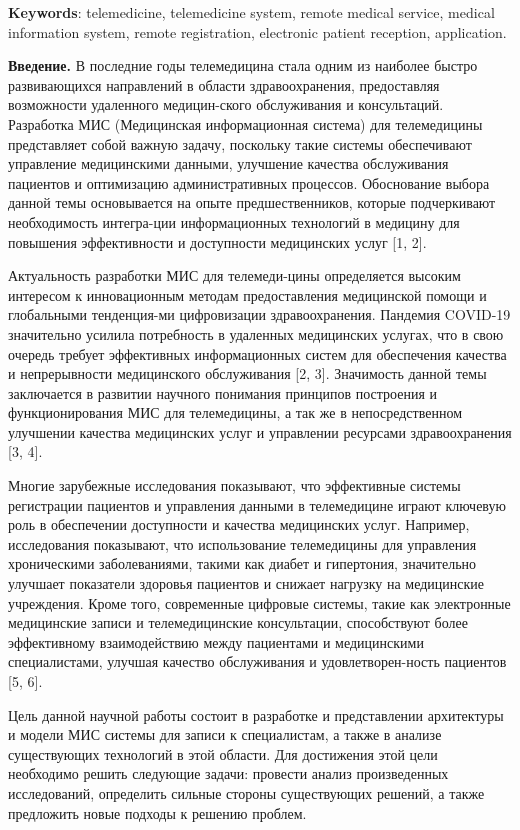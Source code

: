 {\bfseries Keywords}: telemedicine, telemedicine system, remote medical
service, medical information system, remote registration, electronic
patient reception, application.
\begin{multicols}{2}

{\bfseries Введение.} В последние годы телемедицина стала одним из наиболее
быстро развивающихся направлений в области здравоохранения, предоставляя
возможности удаленного медицин-ского обслуживания и консультаций.
Разработка МИС (Медицинская информационная система) для телемедицины
представляет собой важную задачу, поскольку такие системы обеспечивают
управление медицинскими данными, улучшение качества обслуживания
пациентов и оптимизацию административных процессов. Обоснование выбора
данной темы основывается на опыте предшественников, которые подчеркивают
необходимость интегра-ции информационных технологий в медицину для
повышения эффективности и доступности медицинских услуг {[}1, 2{]}.

Актуальность разработки МИС для телемеди-цины определяется высоким
интересом к инновационным методам предоставления медицинской помощи и
глобальными тенденция-ми цифровизации здравоохранения. Пандемия COVID-19
значительно усилила потребность в удаленных медицинских услугах, что в
свою очередь требует эффективных информационных систем для обеспечения
качества и непрерывности медицинского обслуживания {[}2, 3{]}.
Значимость данной темы заключается в развитии научного понимания
принципов построения и функционирования МИС для телемедицины, а так же в
непосредственном улучшении качества медицинских услуг и управлении
ресурсами здравоохранения {[}3, 4{]}.

Многие зарубежные исследования показывают, что эффективные системы
регистрации пациентов и управления данными в телемедицине играют
ключевую роль в обеспечении доступности и качества медицинских услуг.
Например, исследования показывают, что использование телемедицины для
управления хроническими заболеваниями, такими как диабет и гипертония,
значительно улучшает показатели здоровья пациентов и снижает нагрузку на
медицинские учреждения. Кроме того, современные цифровые системы, такие
как электронные медицинские записи и телемедицинские консультации,
способствуют более эффективному взаимодействию между пациентами и
медицинскими специалистами, улучшая качество обслуживания и
удовлетворен-ность пациентов {[}5, 6{]}.

Цель данной научной работы состоит в разработке и представлении
архитектуры и модели МИС системы для записи к специалистам, а также в
анализе существующих технологий в этой области. Для достижения этой цели
необходимо решить следующие задачи: провести анализ произведенных
исследований, определить сильные стороны существующих решений, а также
предложить новые подходы к решению проблем.


\end{multicols}

